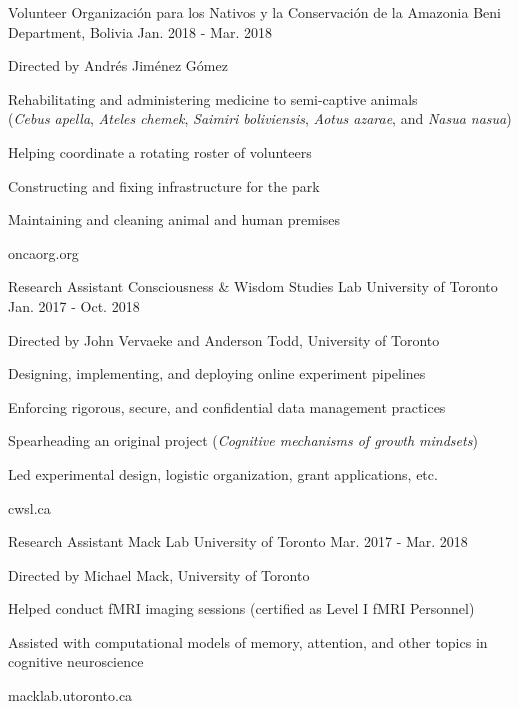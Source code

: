 \begin{cventries}
  \cventry
    {Volunteer} %
    {Organización para los Nativos y la Conservación de la Amazonia} %
    {Beni Department, Bolivia} %
    {Jan. 2018 - Mar. 2018} %
    {
      \begin{cvitems} %
        \item {Directed by Andrés Jiménez Gómez}
        \item{Rehabilitating and administering medicine to semi-captive animals \\ (\textit{Cebus apella}, \textit{Ateles chemek}, \textit{Saimiri boliviensis}, \textit{Aotus azarae}, and \textit{Nasua nasua})}
        \item{Helping coordinate a rotating roster of volunteers}
        \item{Constructing and fixing infrastructure for the park}
        \item{Maintaining and cleaning animal and human premises}
      \end{cvitems}
    }
    {oncaorg.org}

  \cventry
    {Research Assistant} %
    {Consciousness \& Wisdom Studies Lab} %
    {University of Toronto} %
    {Jan. 2017 - Oct. 2018} %
    {
      \begin{cvitems} %
        \item {Directed by John Vervaeke and Anderson Todd, University of Toronto}
        \item{Designing, implementing, and deploying online experiment pipelines}
        \item{Enforcing rigorous, secure, and confidential data management practices}
        \item{Spearheading an original project (\textit{Cognitive mechanisms of growth mindsets})}
        \item{Led experimental design, logistic organization, grant applications, etc.}
      \end{cvitems}
    }
    {cwsl.ca}

  \cventry
    {Research Assistant} %
    {Mack Lab} %
    {University of Toronto} %
    {Mar. 2017 - Mar. 2018} %
    {
      \begin{cvitems} %
        \item {Directed by Michael Mack, University of Toronto}
        \item{Helped conduct fMRI imaging sessions (certified as Level I fMRI Personnel)}
        \item{Assisted with computational models of memory, attention, and other topics in cognitive neuroscience}
      \end{cvitems}
    }
    {macklab.utoronto.ca}


\end{cventries}
